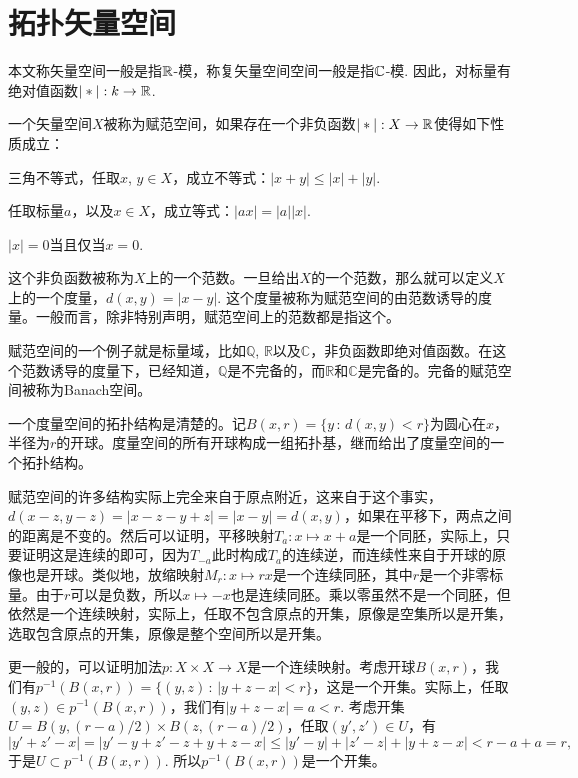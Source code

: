 \section{拓扑矢量空间}

本文称矢量空间一般是指$\mathbb{R}$-模，称复矢量空间空间一般是指$\mathbb{C}$-模. 因此，对标量有绝对值函数$|*|:k\to \mathbb{R}$.

\begin{para}
一个矢量空间$X$被称为赋范空间，如果存在一个非负函数$|*|:X\to \mathbb{R}$使得如下性质成立：
\begin{compactenum}
\item 三角不等式，任取$x$, $y\in X$，成立不等式：$|x+y|\leq |x|+|y|$.
\item 任取标量$a$，以及$x\in X$，成立等式：$|ax|=|a||x|$.
\item $|x|=0$当且仅当$x=0$.
\end{compactenum}
这个非负函数被称为$X$上的一个范数。一旦给出$X$的一个范数，那么就可以定义$X$上的一个度量，$d(x,y)=|x-y|$. 这个度量被称为赋范空间的由范数诱导的度量。一般而言，除非特别声明，赋范空间上的范数都是指这个。

赋范空间的一个例子就是标量域，比如$\mathbb{Q}$, $\mathbb{R}$以及$\mathbb{C}$，非负函数即绝对值函数。在这个范数诱导的度量下，已经知道，$\mathbb{Q}$是不完备的，而$\mathbb{R}$和$\mathbb{C}$是完备的。完备的赋范空间被称为Banach空间。
\end{para}

\begin{para}
一个度量空间的拓扑结构是清楚的。记$B(x,r)=\{y\,:\, d(x,y)<r\}$为圆心在$x$，半径为$r$的开球。度量空间的所有开球构成一组拓扑基，继而给出了度量空间的一个拓扑结构。

赋范空间的许多结构实际上完全来自于原点附近，这来自于这个事实，$d(x-z,y-z)=|x-z-y+z|=|x-y|=d(x,y)$，如果在平移下，两点之间的距离是不变的。然后可以证明，平移映射$T_a:x\mapsto x+a$是一个同胚，实际上，只要证明这是连续的即可，因为$T_{-a}$此时构成$T_a$的连续逆，而连续性来自于开球的原像也是开球。类似地，放缩映射$M_r:x\mapsto rx$是一个连续同胚，其中$r$是一个非零标量。由于$r$可以是负数，所以$x\mapsto -x$也是连续同胚。乘以零虽然不是一个同胚，但依然是一个连续映射，实际上，任取不包含原点的开集，原像是空集所以是开集，选取包含原点的开集，原像是整个空间所以是开集。

更一般的，可以证明加法$p:X\times X\to X$是一个连续映射。考虑开球$B(x,r)$，我们有$p^{-1}(B(x,r))=\{(y,z)\,:\,|y+z-x|<r\}$，这是一个开集。实际上，任取$(y,z)\in p^{-1}(B(x,r))$，我们有$|y+z-x|=a<r$. 考虑开集$U=B(y,(r-a)/2)\times B(z,(r-a)/2)$，任取$(y',z')\in U$，有
\[
	|y'+z'-x|=\left|y'-y+z'-z+y+z-x\right|\leq |y'-y|+|z'-z|+|y+z-x|<r-a+a=r,
\]
于是$U\subset p^{-1}(B(x,r))$. 所以$p^{-1}(B(x,r))$是一个开集。
\end{para}

